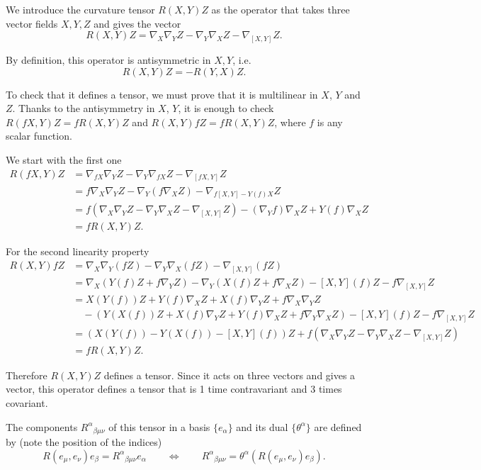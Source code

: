 \begin{points}
\item We introduce the curvature tensor $R(X,Y)Z$ as the operator that takes three vector fields $X,Y,Z$ and gives the vector
\[
  R(X,Y)Z=\nabla_X\nabla_YZ-\nabla_Y\nabla_XZ-\nabla_{[X,Y]}Z .
\]

\item By definition, this operator is antisymmetric in $X,Y$, i.e.
\[
  R(X,Y)Z=-R(Y,X)Z .
\]

\item To check that it defines a tensor, we must prove that it is multilinear in $X$, $Y$ and $Z$. Thanks to the antisymmetry in $X$, $Y$, it is enough to check $R(fX,Y)Z=fR(X,Y)Z$ and $R(X,Y)fZ=fR(X,Y)Z$, where $f$ is any scalar function.

\item We start with the first one
\begin{align*}
  R(fX,Y)Z&=\nabla_{fX}\nabla_YZ-\nabla_Y\nabla_{fX}Z-\nabla_{[fX,Y]}Z\\
  &=f\nabla_X\nabla_YZ-\nabla_Y(f\nabla_XZ)-\nabla_{f[X,Y]-Y(f)X}Z\\
  &=f\left(\nabla_X\nabla_YZ-\nabla_Y\nabla_XZ-\nabla_{[X,Y]}Z\right)-(\nabla_Yf)\nabla_XZ+Y(f)\nabla_XZ\\
  &=fR(X,Y)Z.
\end{align*}

\item For the second linearity property
\begin{align*}
  R(X,Y)fZ&=\nabla_X\nabla_Y(fZ)-\nabla_Y\nabla_X(fZ)-\nabla_{[X,Y]}(fZ)\\
  &=\nabla_X(Y(f)Z+f\nabla_YZ)-\nabla_Y(X(f)Z+f\nabla_XZ)-[X,Y](f)Z-f\nabla_{[X,Y]}Z\\
  &=X(Y(f))Z+Y(f)\nabla_XZ+X(f)\nabla_YZ+f\nabla_X\nabla_YZ\\
  &\quad-(Y(X(f))Z+X(f)\nabla_YZ+Y(f)\nabla_XZ+f\nabla_Y\nabla_XZ)-[X,Y](f)Z-f\nabla_{[X,Y]}Z\\
  &=\left(X(Y(f))-Y(X(f))-[X,Y](f)\right)Z+f\left(\nabla_X\nabla_YZ-\nabla_Y\nabla_XZ-\nabla_{[X,Y]}Z\right)\\
  &=fR(X,Y)Z.
\end{align*}

\item Therefore $R(X,Y)Z$ defines a tensor. Since it acts on three vectors and gives a vector, this operator defines a tensor that is 1 time contravariant and 3 times covariant.

\item The components $R^\alpha{}_{\beta\mu\nu}$ of this tensor in a basis $\{e_\alpha\}$ and its dual $\{\theta^\alpha\}$ are defined by (note the position of the indices)
\[
  R(e_\mu,e_\nu)e_\beta=R^\alpha{}_{\beta\mu\nu}e_\alpha\qquad\Longleftrightarrow\qquad R^\alpha{}_{\beta\mu\nu}=\theta^\alpha\left(R(e_\mu,e_\nu)e_\beta\right).
\]


\end{points}
